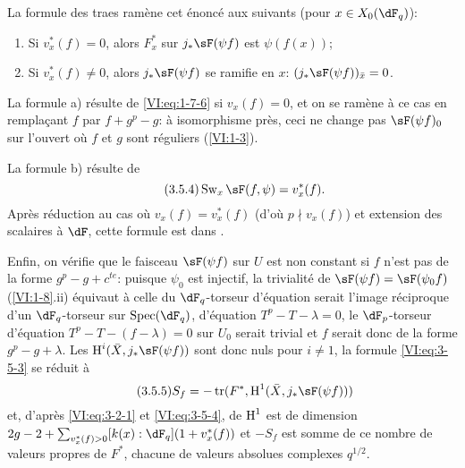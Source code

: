 La formule des traes ram\`ene cet \'enonc\'e aux suivants (pour 
$x\in X_0(\dF_q)$): 
\begin{enumerate}[\indent a)]
  \item Si $v_x^\ast(f)=0$, alors $F_x^\ast$ sur $j_\ast \sF(\psi f)$ est 
    $\psi(f(x))$; 
  \item Si $v_x^\ast(f)\ne 0$, alors $j_\ast \sF(\psi f)$ se ramifie en $x$: 
    $(j_\ast \sF(\psi f))_{\bar x}=0$. 
\end{enumerate}

La formule a) r\'esulte de \eqref{VI:eq:1-7-6} si $v_x(f)=0$, et on se ram\`ene 
\`a ce cas en remplaçant $f$ par $f+g^p-g$: \`a isomorphisme pr\`es, ceci ne 
change pas $\sF(\psi f)_0$ sur l'ouvert o\`u $f$ et $g$ sont r\'eguliers 
(\ref{VI:1-3}). 

La formule b) r\'esulte de 
\begin{equation*}\tag{3.5.4}\label{VI:eq:3-5-4}
  \swan_x \sF(f,\psi) = v_x^\ast(f) \text{.} 
\end{equation*}
Apr\`es r\'eduction au cas o\`u $v_x(f)=v_x^\ast(f)$ (d'o\`u $p\nmid v_x(f)$) 
et extension des scalaires \`a $\dF$, cette formule est dans 
\cite[4.4]{se61}. 

Enfin, on v\'erifie que le faisceau $\sF(\psi f)$ sur $U$ est non constant si 
$f$ n'est pas de la forme $g^p-g+c^{t e}$: puisque $\psi_0$ est injectif, la 
trivialit\'e de $\sF(\psi f)=\sF(\psi_0 f)$ (\ref{VI:1-8}.ii) \'equivaut \`a 
celle du $\dF_q$-torseur d'\'equation serait l'image r\'eciproque d'un 
$\dF_q$-torseur sur $\spec(\dF_q)$, d'\'equation $T^p-T-\lambda=0$, le 
$\dF_p$-torseur d'\'equation $T^p-T-(f-\lambda)=0$ sur $U_0$ serait trivial 
et $f$ serait donc de la forme $g^p-g+\lambda$. Les 
$\h^i(\bar X,j_\ast \sF(\psi f))$ sont donc nuls pour $i\ne 1$, la formule 
\eqref{VI:eq:3-5-3} se r\'eduit \`a 
\begin{equation*}\tag{3.5.5}\label{VI:eq:3-5-5}
  S_f = -\tr(F^\ast,\h^1(\bar X,j_\ast \sF(\psi f))) 
\end{equation*}
et, d'apr\`es \eqref{VI:eq:3-2-1} et \eqref{VI:eq:3-5-4}, de $\operatorname{H}^1$ est de 
dimension $2 g-2+\sum_{v_x^\ast(f)>0} [k(x):\dF_q](1+v_x^\ast(f))$ et $-S_f$ 
est somme de ce nombre de valeurs propres de $F^\ast$, chacune de valeurs 
absolues complexes $q^{1/2}$. 





\subsection{}\label{VI:3-6}

